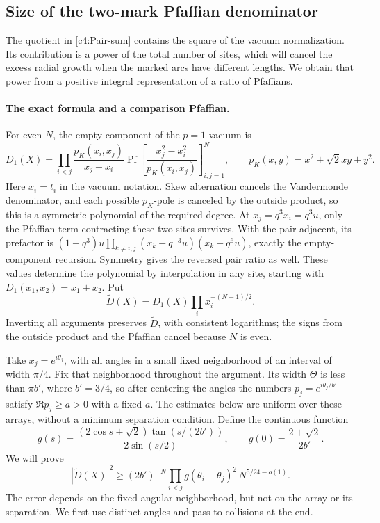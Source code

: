 \subsection{Size of the two-mark Pfaffian denominator}\label{c4:pair-denominator}

The quotient in \eqref{c4:Pair-sum} contains the square of the vacuum
normalization. Its contribution is a power of the total number of sites,
which will cancel the excess radial growth when the marked arcs have
different lengths. We obtain that power from a positive integral
representation of a ratio of Pfaffians.

\paragraph{The exact formula and a comparison Pfaffian.}
For even \(N\), the empty component of the \(p=1\) vacuum is
\[
 D_1(X)=\prod_{i<j}\frac{p_K(x_i,x_j)}{x_j-x_i}
 \operatorname{Pf}\left[\frac{x_j^2-x_i^2}{p_K(x_i,x_j)}\right]_{i,j=1}^N,
 \qquad p_K(x,y)=x^2+\sqrt2xy+y^2.
\]
Here \(x_i=t_i\) in the vacuum notation. Skew alternation cancels the
Vandermonde denominator, and each possible \(p_K\)-pole is canceled by
the outside product, so this is a symmetric polynomial of the required
degree. At \(x_j=q^3x_i=q^3u\), only the Pfaffian term contracting these
two sites survives. With the pair adjacent, its prefactor is
\((1+q^3)u\prod_{k\ne i,j}(x_k-q^{-3}u)(x_k-q^6u)\), exactly the
empty-component recursion. Symmetry gives the reversed pair ratio as
well. These values determine the polynomial by interpolation in any
site, starting with \(D_1(x_1,x_2)=x_1+x_2\). Put
\[
 \widetilde D(X)=D_1(X)\prod_i x_i^{-(N-1)/2}.
\]
Inverting all arguments preserves \(\widetilde D\), with consistent
logarithms; the signs from the outside product and the Pfaffian cancel
because \(N\) is even.

Take \(x_j=e^{i\theta_j}\), with all angles in a small fixed neighborhood
of an interval of width \(\pi/4\). Fix that neighborhood throughout the
argument. Its width \(\Theta\) is less than \(\pi b'\), where
\(b'=3/4\), so after centering the angles the numbers
\(p_j=e^{i\theta_j/b'}\) satisfy \(\Re p_j\ge a>0\) with a fixed
\(a\). The estimates below are uniform over these arrays, without a
minimum separation condition. Define the continuous function
\[
 g(s)=\frac{(2\cos s+\sqrt2)\tan(s/(2b'))}{2\sin(s/2)},
 \qquad g(0)=\frac{2+\sqrt2}{2b'}.
\]
We will prove
\begin{equation}
 |\widetilde D(X)|^2\ge
 (2b')^{-N}\prod_{i<j}g(\theta_i-\theta_j)^2\,
 N^{5/24-o(1)}.                                      \label{c4:Pair-Pf}
\end{equation}
The error depends on the fixed angular neighborhood, but not on the
array or its separation. We first use distinct angles and pass to
collisions at the end.

